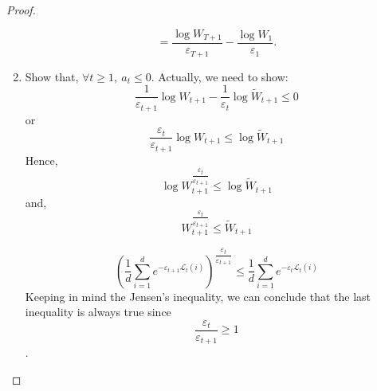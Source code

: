 \documentclass[12pt]{report}
\begin{document}
\begin{proof}
\begin{enumerate}
\[        \]
        \[
            =   \dfrac{\log W_{T+1}}{\varepsilon_{T+1}} - \dfrac{\log W_1}{\varepsilon_1}.
        \]
        \item Show that, $\forall t \geq 1, \ a_t \leq 0$. Actually, we need to show:
        \[
            \dfrac{1}{\varepsilon_{t+1}} \log W_{t+1} - \dfrac{1}{\varepsilon_t} \log \widetilde{W}_{t+1} \leq 0  
        \]
        or 
        \[
            \dfrac{\varepsilon_{t}}{\varepsilon_{t+1}} \log W_{t+1} \leq \log \widetilde{W}_{t+1}  
        \]
        Hence, 
        \[
            \log W_{t+1}^{\dfrac{\varepsilon_t}{\varepsilon_{t+1}}} \leq \log \widetilde{W}_{t+1}  
        \]
        and, 
        \[
            W_{t+1}^{\dfrac{\varepsilon_t}{\varepsilon_{t+1}}} \leq \widetilde{W}_{t+1}  
        \]
        
        \[
            \left(\dfrac{1}{d}\sum\limits_{i=1}^d e^{-\displaystyle \varepsilon_{t+1}\mathcal{L}_t (i)}\right)^{\dfrac{\varepsilon_t}{\varepsilon_{t+1}}} \leq \dfrac{1}{d} \sum\limits_{i=1}^d e^{-\varepsilon_t\mathcal{L}_t(i)}
        \]
        Keeping in mind the Jensen's inequality, we can conclude that the last inequality is always true since \[\dfrac{\varepsilon_t}{\varepsilon_{t+1}} \geq 1 \].
        

\end{enumerate}
\end{proof}
\end{document}
